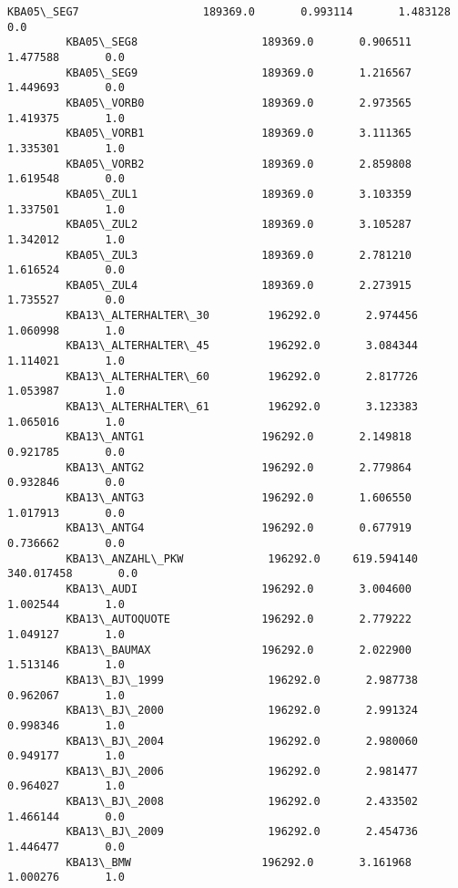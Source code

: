 \documentclass[11pt]{article}
\begin{document}
\begin{Verbatim}[commandchars=\\\{\}]
         KBA05\_SEG7                   189369.0       0.993114       1.483128       0.0   
         KBA05\_SEG8                   189369.0       0.906511       1.477588       0.0   
         KBA05\_SEG9                   189369.0       1.216567       1.449693       0.0   
         KBA05\_VORB0                  189369.0       2.973565       1.419375       1.0   
         KBA05\_VORB1                  189369.0       3.111365       1.335301       1.0   
         KBA05\_VORB2                  189369.0       2.859808       1.619548       0.0   
         KBA05\_ZUL1                   189369.0       3.103359       1.337501       1.0   
         KBA05\_ZUL2                   189369.0       3.105287       1.342012       1.0   
         KBA05\_ZUL3                   189369.0       2.781210       1.616524       0.0   
         KBA05\_ZUL4                   189369.0       2.273915       1.735527       0.0   
         KBA13\_ALTERHALTER\_30         196292.0       2.974456       1.060998       1.0   
         KBA13\_ALTERHALTER\_45         196292.0       3.084344       1.114021       1.0   
         KBA13\_ALTERHALTER\_60         196292.0       2.817726       1.053987       1.0   
         KBA13\_ALTERHALTER\_61         196292.0       3.123383       1.065016       1.0   
         KBA13\_ANTG1                  196292.0       2.149818       0.921785       0.0   
         KBA13\_ANTG2                  196292.0       2.779864       0.932846       0.0   
         KBA13\_ANTG3                  196292.0       1.606550       1.017913       0.0   
         KBA13\_ANTG4                  196292.0       0.677919       0.736662       0.0   
         KBA13\_ANZAHL\_PKW             196292.0     619.594140     340.017458       0.0   
         KBA13\_AUDI                   196292.0       3.004600       1.002544       1.0   
         KBA13\_AUTOQUOTE              196292.0       2.779222       1.049127       1.0   
         KBA13\_BAUMAX                 196292.0       2.022900       1.513146       1.0   
         KBA13\_BJ\_1999                196292.0       2.987738       0.962067       1.0   
         KBA13\_BJ\_2000                196292.0       2.991324       0.998346       1.0   
         KBA13\_BJ\_2004                196292.0       2.980060       0.949177       1.0   
         KBA13\_BJ\_2006                196292.0       2.981477       0.964027       1.0   
         KBA13\_BJ\_2008                196292.0       2.433502       1.466144       0.0   
         KBA13\_BJ\_2009                196292.0       2.454736       1.446477       0.0   
         KBA13\_BMW                    196292.0       3.161968       1.000276       1.0   

\end{Verbatim}
\end{document}
